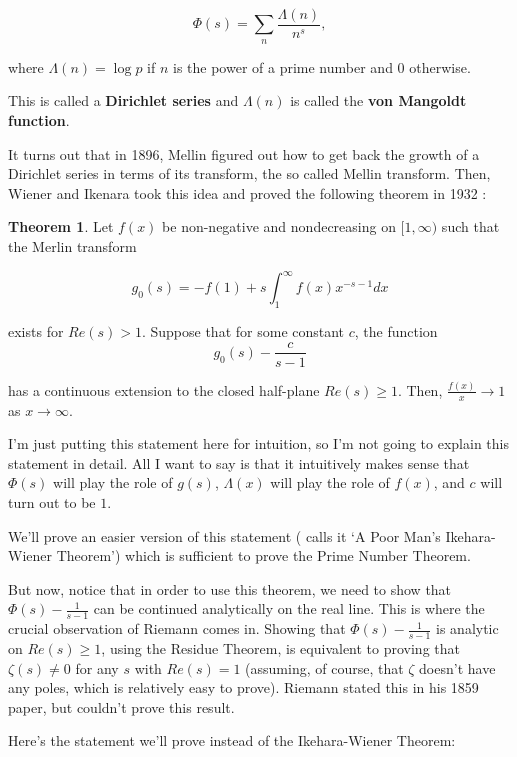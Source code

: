 \documentclass{article}
\theoremstyle{definition}
\newtheorem{theorem}{Theorem}[section]
\begin{document}
\[ \Phi(s) = \sum_{n} \frac{\Lambda(n)}{n^{s}}, \]

where $ \Lambda(n) = \log p $ if $ n $ is the power of a prime number and $ 0 $ otherwise.

This is called a \textbf{Dirichlet series} and $ \Lambda(n) $ is called the \textbf{von Mangoldt function}.

It turns out that in 1896, Mellin figured out how to get back the growth of a Dirichlet series
in terms of its transform, the so called Mellin transform. Then, Wiener and Ikenara
took this idea and proved the following theorem in 1932 \cite{korevaar_newmans_1982}:

\begin{theorem}
    Let $ f(x) $ be non-negative and nondecreasing on $ [1,\infty) $ such that the Merlin
    transform

    \[ g_{0}(s) = - f(1) + s \int_{1}^{\infty} f(x) x^{-s - 1} dx \]
    
    exists for $ Re(s) > 1 $. Suppose that for some constant $ c $, the function 
    \[ g_{0}(s) - \frac{c}{s-1} \]

    has a continuous extension to the closed half-plane $ Re(s) \geq 1 $. Then, $ \frac{f(x)}{x} \to 1 $
    as $ x \to \infty $.
\end{theorem}

I'm just putting this statement here for intuition, so I'm not going to explain this statement in detail.
All I want to say is that it intuitively makes sense that $ \Phi(s) $ will play the role of $ g(s) $,
$ \Lambda(x) $ will play the role of $ f(x) $, and $ c $ will turn out to be $ 1 $.

We'll prove an easier version of this statement (\cite{korevaar_newmans_1982} calls it `A Poor Man's Ikehara-Wiener Theorem')
which is sufficient to prove the Prime Number Theorem.

But now, notice that in order to use this theorem, we need to show that $ \Phi(s) - \frac{1}{s - 1} $
can be continued analytically on the real line. This is where the crucial observation of Riemann
comes in. Showing that $ \Phi(s) - \frac{1}{s - 1} $ is analytic on $ Re(s) \geq 1 $, using the Residue
Theorem, is equivalent to proving that $ \zeta(s) \neq 0 $ for any $ s $ with $ Re(s) = 1 $ (assuming,
of course, that $ \zeta $ doesn't have any poles, which is relatively easy to prove).
Riemann stated this in his 1859 paper, but couldn't prove this result.

Here's the statement we'll prove instead of the Ikehara-Wiener Theorem:
\end{document}
